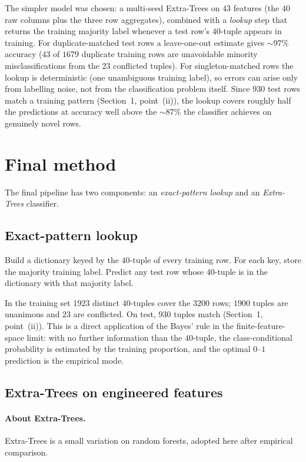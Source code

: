 \documentclass[11pt,a4paper]{article}
\begin{document}
The simpler model was chosen: a multi-seed Extra-Trees on $43$ features (the $40$ raw
columns plus the three row aggregates), combined with a \emph{lookup} step that returns the
training majority label whenever a test row's $40$-tuple appears in training. For duplicate-matched test rows a leave-one-out estimate gives $\sim 97\%$ accuracy ($43$ of $1679$ duplicate training rows are unavoidable minority misclassifications from
the $23$ conflicted tuples). For singleton-matched rows the lookup is deterministic (one
unambiguous training label), so errors can arise only from labelling noise, not from the
classification problem itself. Since $930$ test rows match a training pattern (Section~1, point~(ii)), the lookup
covers roughly half the predictions at accuracy well above the $\sim 87\%$ the classifier
achieves on genuinely novel rows.

\section{Final method}
\label{sec:method}

The final pipeline has two components: an \emph{exact-pattern lookup} and an
\emph{Extra-Trees} classifier. 

\subsection{Exact-pattern lookup}

Build a dictionary keyed by the $40$-tuple of every training row. For each key, store the
majority training label. Predict any test row whose $40$-tuple is in the dictionary with
that majority label.

In the training set $1923$ distinct $40$-tuples cover the $3200$ rows; $1900$ tuples are
unanimous and $23$ are conflicted. On test, $930$ tuples match (Section~1, point~(ii)).
This is a direct application of the Bayes' rule in the finite-feature-space limit: with no
further information than the $40$-tuple, the class-conditional probability is estimated by
the training proportion, and the optimal $0$--$1$ prediction is the empirical mode.

\subsection{Extra-Trees on engineered features}

\paragraph{About Extra-Trees.} Extra-Trees is a small variation on random forests, adopted here after empirical
comparison.
\end{document}
